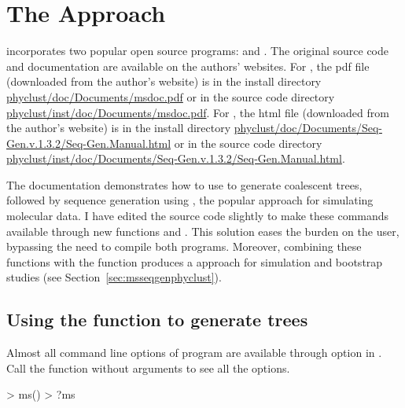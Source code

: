 \section[The ms+seqgen Approach]{The  Approach}
\label{sec:msseqgen}

 incorporates two popular open source  programs:
 \citep{Hudson2002} and  \citep{Rambaut1997}.
The original source code and documentation are available on the authors'
websites.
For ,
the pdf file (downloaded from the author's website) is in the install directory
\url{phyclust/doc/Documents/msdoc.pdf} or in the source code directory
\url{phyclust/inst/doc/Documents/msdoc.pdf}.
For ,
the html file (downloaded from the author's website) is in the install directory
\url{phyclust/doc/Documents/Seq-Gen.v.1.3.2/Seq-Gen.Manual.html}
or in the source code directory
\url{phyclust/inst/doc/Documents/Seq-Gen.v.1.3.2/Seq-Gen.Manual.html}.

The  documentation demonstrates how to use 
to generate coalescent trees, followed by sequence generation using ,
the popular  approach for simulating molecular data.
I have edited the source code slightly to make these commands available through new  functions  and .
This solution eases the burden on the user, bypassing the need to compile both programs.
Moreover, combining these functions with the  function produces a
 approach 
 for simulation and bootstrap studies (see Section~\ref{sec:msseqgenphyclust}).




\subsection[Using the ms() function to generate trees]{Using the  function to generate trees}
\label{sec:ms}

Almost all command line options of program  are available
through option  in .
Call the function without arguments to see all the options.
\begin{Code}
> ms()
> ?ms
\end{Code}

